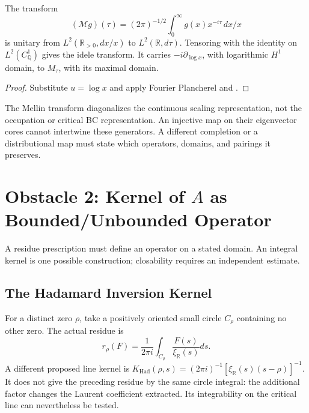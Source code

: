 \begin{lemma}
\label{v4-arith:w9-r4:lem:mellin-on-idele}
The transform
\[
 (\mathcal Mg)(\tau)=(2\pi)^{-1/2}
 \int_0^\infty g(x)x^{-i\tau}\,dx/x
\]
is unitary from \(L^2(\mathbb R_{>0},dx/x)\) to
\(L^2(\mathbb R,d\tau)\). Tensoring with the identity on
\(L^2(C_{\mathbb Q}^1)\) gives the idele transform. It carries
\(-i\partial_{\log x}\), with logarithmic \(H^1\) domain, to
\(M_\tau\), with its maximal domain.
\end{lemma}
\begin{proof}
Substitute \(u=\log x\) and apply Fourier Plancherel and
.
\end{proof}

\begin{remark}
\label{v4-arith:w9-r4:rem:completion-mismatch}
The Mellin transform diagonalizes the continuous scaling
representation, not the occupation or critical BC representation.
An injective map on their eigenvector cores cannot intertwine
these generators. A different completion or a distributional map
must state which operators, domains, and pairings it preserves.
\end{remark}

\section{Obstacle 2: Kernel of \(A\) as Bounded/Unbounded Operator}
\label{v4-arith:w9-r4:obstacle-kernel}

A residue prescription must define an operator on a stated domain.
An integral kernel is one possible construction; closability
requires an independent estimate.

\subsection{The Hadamard Inversion Kernel}
\label{v4-arith:w9-r4:obstacle-kernel:had}

\begin{definition}
\label{v4-arith:w9-r4:def:formal-had-kernel}
For a distinct zero \(\rho\), take a positively oriented small
circle \(C_\rho\) containing no other zero. The actual residue is
\[
 r_\rho(F)=\frac1{2\pi i}\int_{C_\rho}\frac{F(s)}{\xi_{\mathbb R}(s)}ds.
\]
A different proposed line kernel is
\(K_{\mathrm{Had}}(\rho,s)=(2\pi i)^{-1}
[\xi_{\mathbb R}(s)(s-\rho)]^{-1}\).
It does not give the preceding residue by the same circle integral:
the additional factor changes the Laurent coefficient extracted.
Its integrability on the critical line can nevertheless be tested.
\end{definition}

